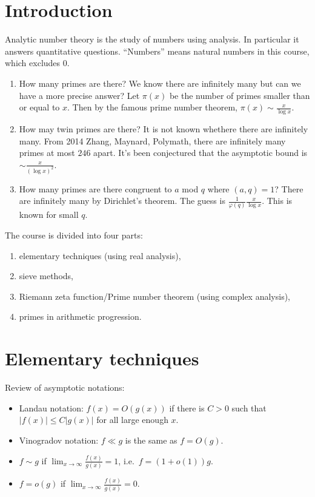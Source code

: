 \documentclass[a4paper]{article}
\theoremstyle{definition}
\begin{document}


\tableofcontents

\setcounter{section}{-1}

\section{Introduction}

Analytic number theory is the study of numbers using analysis. In particular it answers quantitative questions. ``Numbers'' means natural numbers in this course, which excludes \(0\).

\begin{eg}\leavevmode
  \begin{enumerate}
  \item How many primes are there? We know there are infinitely many but can we have a more precise answer? Let \(\pi(x)\) be the number of primes smaller than or equal to \(x\). Then by the famous prime number theorem, \(\pi(x) \sim \frac{x}{\log x}\).
  \item How may twin primes are there? It is not known whethere there are infinitely many. From 2014 Zhang, Maynard, Polymath, there are infinitely many primes at most \(246\) apart. It's been conjectured that the asymptotic bound is \(\sim \frac{x}{(\log x)^2}\).
  \item How many primes are there congruent to \(a\) mod \(q\) where \((a, q) = 1\)? There are infinitely many by Dirichlet's theorem. The guess is \(\frac{1}{\varphi(q)}\frac{x}{\log x}\). This is known for small \(q\).
  \end{enumerate}
\end{eg}

The course is divided into four parts:
\begin{enumerate}
\item elementary techniques (using real analysis),
\item sieve methods,
\item Riemann zeta function/Prime number theorem (using complex analysis),
\item primes in arithmetic progression.
\end{enumerate}

\section{Elementary techniques}

Review of asymptotic notations:
\begin{itemize}
\item Landau notation: \(f(x) = O(g(x))\) if there is \(C > 0\) such that \(|f(x)| \leq C|g(x)|\) for all large enough \(x\).
\item Vinogradov notation: \(f \ll g\) is the same as \(f = O(g)\).
\item \(f \sim g\) if \(\lim_{x \to \infty} \frac{f(x)}{g(x)} = 1\), i.e.\ \(f = (1 + o(1)) g\).
\item \(f = o(g)\) if \(\lim_{x \to \infty} \frac{f(x)}{g(x)} = 0\).
\end{itemize}
\end{document}
